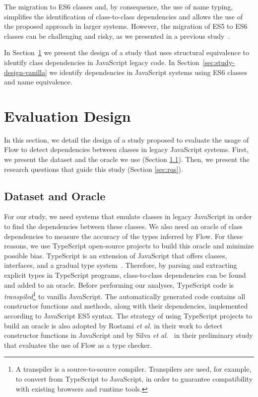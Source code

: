 \documentclass[review]{elsarticle}
\begin{document}
The migration to ES6 classes and, by consequence, the use of name typing, simplifies the identification of class-to-class dependencies and allows the use of the proposed approach in larger systems. However, the migration of ES5 to ES6 classes can be challenging and risky, as we presented in a previous study~\cite{icsr2017}. 

In Section~\ref{sec:study-design} we present the design of a study that uses structural equivalence to identify class dependencies in JavaScript legacy code. In Section~\ref{sec:study-design-vanilla} we identify dependencies in JavaScript systems using ES6 classes and name equivalence.

\section{Evaluation Design}
\label{sec:study-design}

In this section, we detail the design of a study proposed to evaluate the usage of Flow to detect dependencies between classes in legacy JavaScript systems. First, we present the dataset and the oracle we use (Section \ref{sec:dataset-oracle}). Then, we present the research questions that guide this study (Section \ref{sec:rqs}).

\subsection{Dataset and Oracle}
\label{sec:dataset-oracle}

For our study, we need systems that emulate classes in legacy JavaScript in order to find the dependencies between these classes. We also need an oracle of class dependencies to measure the accuracy of the types inferred by Flow. For these reasons, we use TypeScript open-source projects to build this oracle and minimize possible bias. TypeScript is an extension of JavaScript that offers classes, interfaces, and a gradual type system~\cite{nance2014}. Therefore, by parsing and extracting explicit types in TypeScript programs, class-to-class dependencies can be found and added to an oracle. Before performing our analyses, TypeScript code is \textit{transpiled}\footnote{A transpiler is a source-to-source compiler. Transpilers are used, for example, to convert from TypeScript to JavaScript, in order to guarantee compatibility with existing browsers and runtime tools.} to vanilla JavaScript. The automatically generated code contains all constructor functions and methods, along with their dependencies, implemented according to JavaScript ES5 syntax. The strategy of using TypeScript projects to build an oracle is also adopted by Rostami \emph{et al.} \cite{rostami2016} in their work to detect constructor functions in JavaScript and by Silva \emph{et al.}~\cite{sanerera2017} in their preliminary study that evaluates the use of Flow as a type checker.
\end{document}
